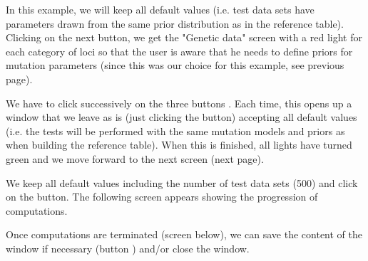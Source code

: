 {%

In this example, we will keep all default values (i.e. test data sets have parameters drawn from the same prior distribution as in the reference table).\\
Clicking on the next button, we get the "Genetic data" screen with a red light for each category of loci so that the user is aware that he needs to define priors for mutation parameters (since this was our choice for this example, see previous page).


We have to click successively on the three buttons . Each time, this opens up a window that we leave as is (just clicking the  button) accepting all default values (i.e. the tests will be performed with the same mutation models and priors as when building the reference table). When this is finished, all lights have turned green and we move forward to the next screen (next page).

\newpage


We keep all default values including the number of test data sets (500) and click on the  button. The following screen appears showing the progression of computations.


Once computations are terminated (screen below), we can save the content of the window if necessary (button ) and/or close the window.

}
